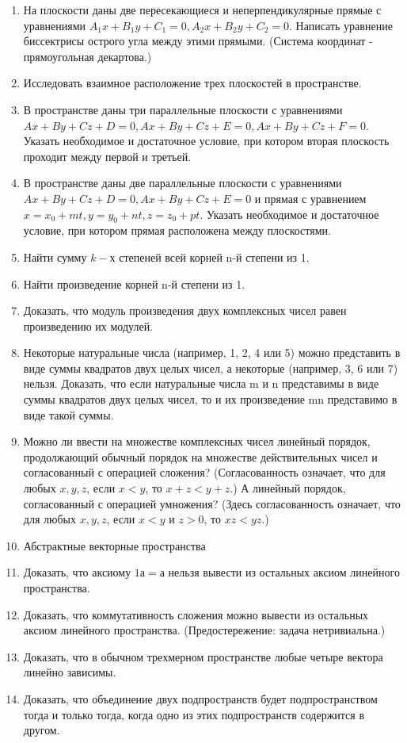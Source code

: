 \documentclass[a4paper]{article}
\begin{document}
\begin{enumerate}
\item На плоскости даны две пересекающиеся и неперпендикулярные прямые с уравнениями $A_1x+B_1y+C_1=0, A_2x+B_2y+C_2=0$. Написать уравнение биссектрисы острого угла между этими прямыми. (Система координат - прямоугольная декартова.)
\item Исследовать взаимное расположение трех плоскостей в пространстве.
\item В пространстве даны три параллельные плоскости с уравнениями $Ax+By+Cz+D=0, Ax+By+Cz+E=0, Ax+By+Cz+F=0$. Указать необходимое и достаточное условие, при котором вторая плоскость проходит между первой и третьей.
\item В пространстве даны две параллельные плоскости с уравнениями $Ax+By+Cz+D=0, Ax+By+Cz+E=0$ и прямая с уравнением $x=x_0+mt, y=y_0+nt, z=z_0+pt$. Указать необходимое и достаточное условие, при котором прямая расположена между плоскостями.
\item Найти сумму $k-х$ степеней всей корней n-й степени из 1.
\item Найти произведение корней n-й степени из 1.
\item Доказать, что модуль произведения двух комплексных чисел равен произведению их модулей.
\item Некоторые натуральные числа (например, 1, 2, 4 или 5) можно представить в виде суммы квадратов двух целых чисел, а некоторые (например, 3, 6 или 7) нельзя. Доказать, что если натуральные числа m и n представимы в виде суммы квадратов двух целых чисел, то и их произведение mn представимо в виде такой суммы.
\item Можно ли ввести на множестве комплексных чисел линейный порядок, продолжающий обычный порядок на множестве действительных чисел и согласованный с операцией сложения? (Согласованность означает, что для любых $x,y,z$, если $x < y$, то $x+z < y+z$.) А линейный порядок, согласованный с операцией умножения? (Здесь согласованность означает, что для любых $x,y,z$, если $x < y$ и $z > 0$, то $xz < yz$.)
\item Абстрактные векторные пространства
\item Доказать, что аксиому $1а=а$ нельзя вывести из остальных аксиом линейного пространства.
\item Доказать, что коммутативность сложения можно вывести из остальных аксиом линейного пространства. (Предостережение: задача нетривиальна.)
\item Доказать, что в обычном трехмерном пространстве любые четыре вектора линейно зависимы.
\item Доказать, что объединение двух подпространств будет подпространством тогда и только тогда, когда одно из этих подпространств содержится в другом.

\end{enumerate}
\end{document}
